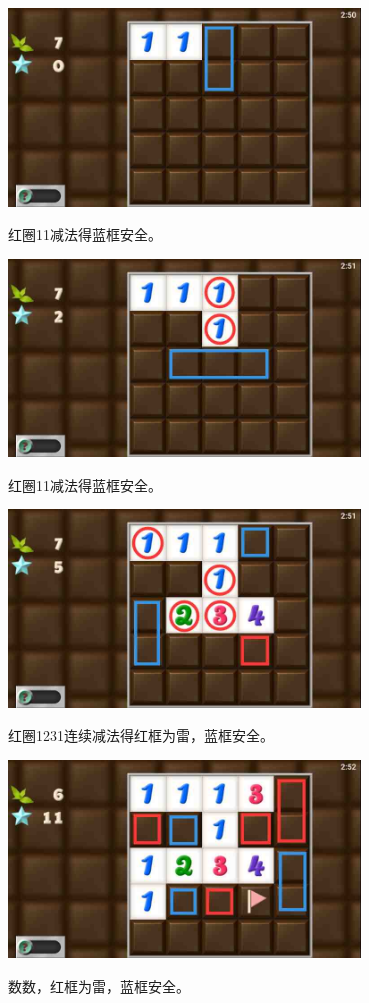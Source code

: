 \subsection{} %
\begin{center}
    \includegraphics[width=0.7\textwidth]{puzzlelow/35-1.jpg}
\end{center}
红圈11减法得蓝框安全。
\begin{center}
    \includegraphics[width=0.7\textwidth]{puzzlelow/35-2.jpg}
\end{center}
红圈11减法得蓝框安全。
\begin{center}
    \includegraphics[width=0.7\textwidth]{puzzlelow/35-3.jpg}
\end{center}
红圈1231连续减法得红框为雷，蓝框安全。
\begin{center}
    \includegraphics[width=0.7\textwidth]{puzzlelow/35-4.jpg}
\end{center}
数数，红框为雷，蓝框安全。

